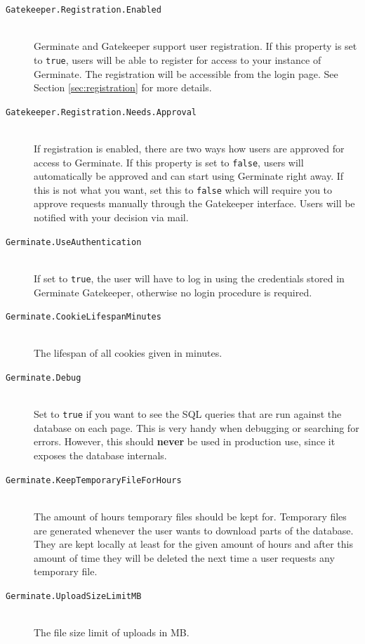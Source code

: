 \begin{description}
    \item[\texttt{Gatekeeper.Registration.Enabled}] \\Germinate and Gatekeeper support user registration. If this property is set to \texttt{true}, users will be able to register for access to your instance of Germinate. The registration will be accessible from the login page. See Section \ref{sec:registration} for more details.
    \item[\texttt{Gatekeeper.Registration.Needs.Approval}] \\If registration is enabled, there are two ways how users are approved for access to Germinate. If this property is set to \texttt{false}, users will automatically be approved and can start using Germinate right away. If this is not what you want, set this to \texttt{false} which will require you to approve requests manually through the Gatekeeper interface. Users will be notified with your decision via mail.
    \item[\texttt{Germinate.UseAuthentication}] \\If set to \texttt{true}, the user will have to log in using the credentials stored in Germinate Gatekeeper, otherwise no login procedure is required.
    \item[\texttt{Germinate.CookieLifespanMinutes}] \\The lifespan of all cookies given in minutes.
    \item[\texttt{Germinate.Debug}] \\Set to \texttt{true} if you want to see the SQL queries that are run against the database on each page. This is very handy when debugging or searching for errors. However, this should \textbf{never} \label{key}be used in production use, since it exposes the database internals.
    \item[\texttt{Germinate.KeepTemporaryFileForHours}] \\The amount of hours temporary files should be kept for. Temporary files are generated whenever the user wants to download parts of the database. They are kept locally at least for the given amount of hours and after this amount of time they will be deleted the next time a user requests any temporary file.
    \item[\texttt{Germinate.UploadSizeLimitMB}] \\The file size limit of uploads in MB.

\end{description}
